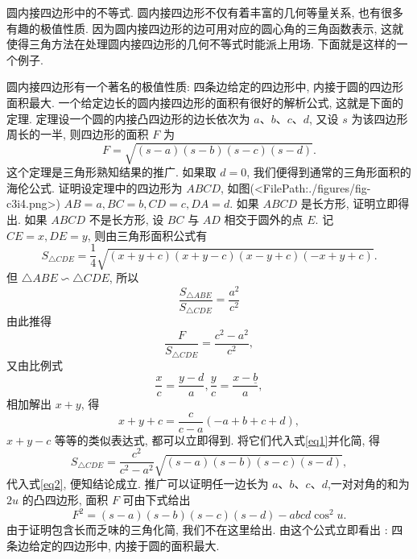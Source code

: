 
圆内接四边形中的不等式.
圆内接四边形不仅有着丰富的几何等量关系, 也有很多有趣的极值性质.
因为圆内接四边形的边可用对应的圆心角的三角函数表示, 这就使得三角方法在处理圆内接四边形的几何不等式时能派上用场.
下面就是这样的一个例子.



圆内接四边形有一个著名的极值性质: 四条边给定的四边形中, 内接于圆的四边形面积最大.
一个给定边长的圆内接四边形的面积有很好的解析公式, 这就是下面的定理.
定理设一个圆的内接凸四边形的边长依次为 $a 、 b 、 c 、 d$, 又设 $s$ 为该四边形周长的一半, 则四边形的面积 $F$ 为
$$
F=\sqrt{(s-a)(s-b)(s-c)(s-d)} .
$$
这个定理是三角形熟知结果的推广.
如果取 $d=0$, 我们便得到通常的三角形面积的海伦公式.
证明设定理中的四边形为 $A B C D$, 如图(<FilePath:./figures/fig-c3i4.png>)  $A B=a, B C=b, C D=c, D A=d$.
如果 $A B C D$ 是长方形, 证明立即得出.
如果 $A B C D$ 不是长方形, 设 $B C$ 与 $A D$ 相交于圆外的点 $E$. 记 $C E=x, D E=y$, 则由三角形面积公式有
$$
S_{\triangle C D E}=\frac{1}{4} \sqrt{(x+y+c)(x+y-c)(x-y+c)(-x+y+c)} . \label{eq1}
$$
但 $\triangle A B E \backsim \triangle C D E$, 所以
$$
\frac{S_{\triangle A B E}}{S_{\triangle C D E}}=\frac{a^2}{c^2}
$$
由此推得
$$
\frac{F}{S_{\triangle C D E}}=\frac{c^2-a^2}{c^2}, \label{eq2}
$$
又由比例式
$$
\frac{x}{c}=\frac{y-d}{a}, \frac{y}{c}=\frac{x-\underline{b}}{a},
$$
相加解出 $x+y$, 得
$$
x+y+c=\frac{c}{c-a}(-a+b+c+d),
$$
$x+y-c$ 等等的类似表达式, 都可以立即得到.
将它们代入式\ref{eq1}并化简, 得
$$
S_{\triangle C D E}=\frac{c^2}{c^2-a^2} \sqrt{(s-a)(s-b)(s-c)(s-d)},
$$
代入式\ref{eq2}, 便知结论成立.
推广可以证明任一边长为 $a 、 b 、 c 、 d$,一对对角的和为 $2 u$ 的凸四边形, 面积 $F$ 可由下式给出
$$
F^2=(s-a)(s-b)(s-c)(s-d)-a b c d \cos ^2 u .
$$
由于证明包含长而乏味的三角化简, 我们不在这里给出.
由这个公式立即看出 : 四条边给定的四边形中, 内接于圆的面积最大.



